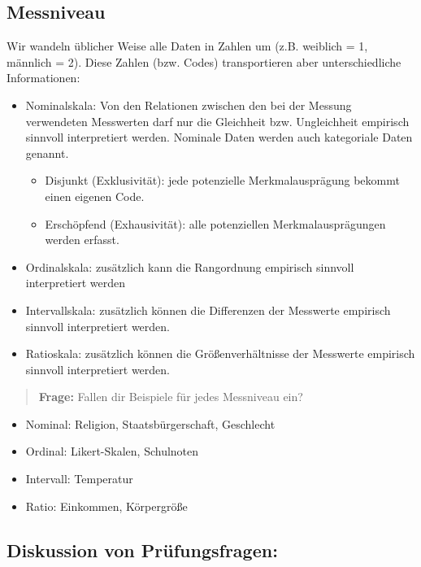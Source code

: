 \documentclass[
]{book}
\providecommand{\tightlist}{%
  \setlength{\itemsep}{0pt}\setlength{\parskip}{0pt}}
\begin{document}
\hypertarget{messniveau}{%
\subsection{Messniveau}\label{messniveau}}

Wir wandeln üblicher Weise alle Daten in Zahlen um (z.B. weiblich = 1, männlich = 2). Diese Zahlen (bzw. Codes) transportieren aber unterschiedliche Informationen:

\begin{itemize}
\tightlist
\item
  Nominalskala: Von den Relationen zwischen den bei der Messung verwendeten Messwerten darf nur die Gleichheit bzw. Ungleichheit empirisch sinnvoll interpretiert werden. Nominale Daten werden auch kategoriale Daten genannt.

  \begin{itemize}
  \tightlist
  \item
    Disjunkt (Exklusivität): jede potenzielle Merkmalausprägung bekommt einen eigenen Code.
  \item
    Erschöpfend (Exhausivität): alle potenziellen Merkmalausprägungen werden erfasst.
  \end{itemize}
\item
  Ordinalskala: zusätzlich kann die Rangordnung empirisch sinnvoll interpretiert werden
\item
  Intervallskala: zusätzlich können die Differenzen der Messwerte empirisch sinnvoll interpretiert werden.
\item
  Ratioskala: zusätzlich können die Größenverhältnisse der Messwerte empirisch sinnvoll interpretiert werden.
\end{itemize}

\begin{quote}
\textbf{Frage:} Fallen dir Beispiele für jedes Messniveau ein?
\end{quote}

\begin{itemize}
\tightlist
\item
  Nominal: Religion, Staatsbürgerschaft, Geschlecht
\item
  Ordinal: Likert-Skalen, Schulnoten
\item
  Intervall: Temperatur
\item
  Ratio: Einkommen, Körpergröße
\end{itemize}

\hypertarget{diskussion-von-pruxfcfungsfragen}{%
\subsection{Diskussion von Prüfungsfragen:}\label{diskussion-von-pruxfcfungsfragen}}
\end{document}
